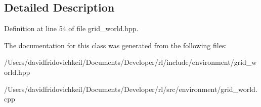 \subsection{Detailed Description}


Definition at line 54 of file grid\+\_\+world.\+hpp.



The documentation for this class was generated from the following files\+:\begin{DoxyCompactItemize}
\item 
/\+Users/davidfridovichkeil/\+Documents/\+Developer/rl/include/environment/grid\+\_\+world.\+hpp\item 
/\+Users/davidfridovichkeil/\+Documents/\+Developer/rl/src/environment/grid\+\_\+world.\+cpp\end{DoxyCompactItemize}
